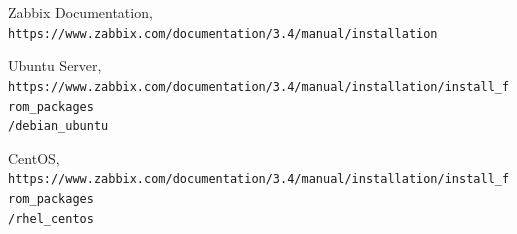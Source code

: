 \newpage
\begin{thebibliography}{9}
	Zabbix Documentation,
	\\\texttt{https://www.zabbix.com/documentation/3.4/manual/installation}
	
	Ubuntu Server,
	\\\texttt{https://www.zabbix.com/documentation/3.4/manual/installation/install\_from\_packages\\/debian\_ubuntu}
	
	CentOS,
	\\\texttt{https://www.zabbix.com/documentation/3.4/manual/installation/install\_from\_packages\\/rhel\_centos}
	
\end{thebibliography}



